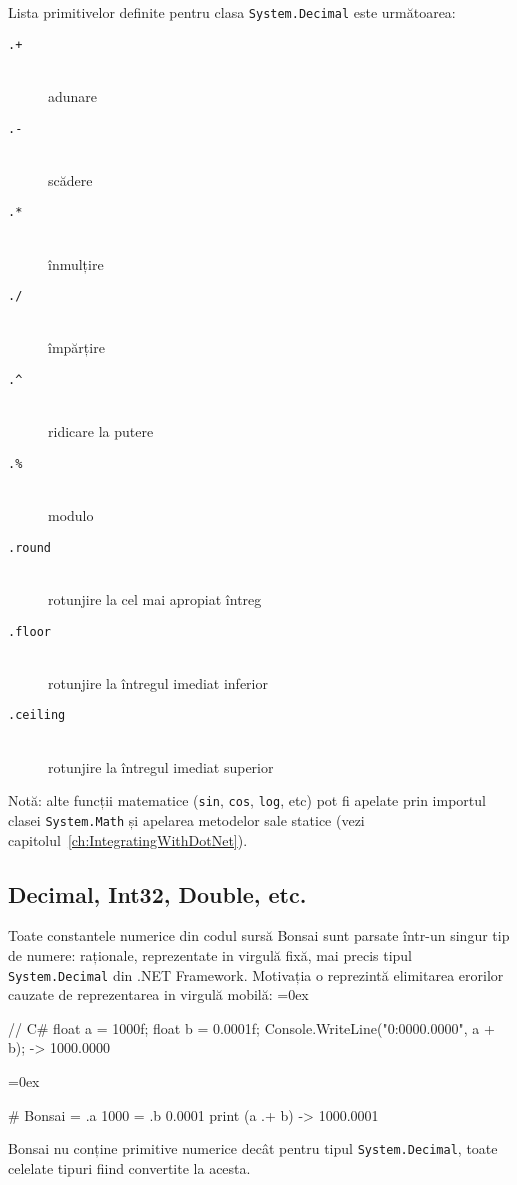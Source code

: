 \documentclass[12pt,a4paper]{memoir}
\renewcommand{\c}{\texttt}
\newenvironment{code}
{
\definecolor{shadecolor}{gray}{0.91}
\topsep=0ex
\relax
\shaded
\verbatim
}
{
\endverbatim
\endshaded
}
\begin{document}
Lista primitivelor definite pentru clasa \c{System.Decimal} este următoarea:

\begin{description}
\item[\c{.+}]\hfill\\ adunare
\item[\c{.-}]\hfill\\ scădere
\item[\c{.*}]\hfill\\ înmulțire
\item[\c{./}]\hfill\\ împărțire
\item[\c{.\textasciicircum}]\hfill\\ ridicare la putere
\item[\c{.\%}]\hfill\\ modulo
\item[\c{.round}]\hfill\\ rotunjire la cel mai apropiat întreg
\item[\c{.floor}]\hfill\\ rotunjire la întregul imediat inferior
\item[\c{.ceiling}]\hfill\\ rotunjire la întregul imediat superior
\end{description}

Notă: alte funcții matematice (\c{sin}, \c{cos}, \c{log}, etc) pot fi apelate prin importul clasei \c{System.Math} și apelarea metodelor sale statice (vezi capitolul \ref{ch:IntegratingWithDotNet}).

\subsection{Decimal, Int32, Double, etc.}

Toate constantele numerice din codul sursă Bonsai sunt parsate într-un singur tip de numere: raționale, reprezentate in virgulă fixă, mai precis tipul \c{System.Decimal} din .NET Framework. Motivația o reprezintă elimitarea erorilor cauzate de reprezentarea in virgulă mobilă:
\begin{code}
// C#
float a = 1000f;
float b = 0.0001f;
Console.WriteLine("{0:0000.0000}", a + b);
  -> 1000.0000
\end{code}
\begin{code}
# Bonsai
= .a 1000
= .b 0.0001
print (a .+ b)
  -> 1000.0001
\end{code}

Bonsai nu conține primitive numerice decât pentru tipul \c{System.Decimal}, toate celelate tipuri fiind convertite la acesta.
\end{document}
